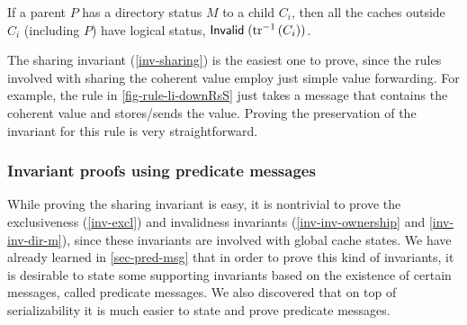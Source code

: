 \begin{invariant}
  \label{inv-inv-dir-m}
  If a parent $P$ has a directory status $M$ to a child $C_i$, then all the caches outside $C_i$ (including $P$) have logical \stI{} status, \ie{} $\textsf{Invalid}\;(\textrm{tr}^{-1}\,(C_i))$.
\end{invariant}

The sharing invariant (\autoref{inv-sharing}) is the easiest one to prove, since the rules involved with sharing the coherent value employ just simple value forwarding.
For example, the rule in \autoref{fig-rule-li-downRsS} just takes a message  that contains the coherent value and stores/sends the value.
Proving the preservation of the invariant for this rule is very straightforward.

\subsubsection{Invariant proofs using predicate messages}

While proving the sharing invariant is easy, it is nontrivial to prove the exclusiveness (\autoref{inv-excl}) and invalidness invariants (\autoref{inv-inv-ownership} and \autoref{inv-inv-dir-m}), since these invariants are involved with global cache states.
We have already learned in \autoref{sec-pred-msg} that in order to prove this kind of invariants, it is desirable to state some supporting invariants based on the existence of certain messages, called predicate messages.
We also discovered that on top of serializability it is much easier to state and prove predicate messages.

